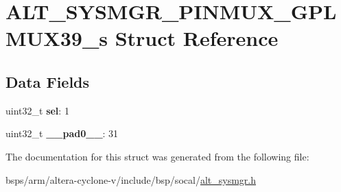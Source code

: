\hypertarget{structALT__SYSMGR__PINMUX__GPLMUX39__s}{}\section{A\+L\+T\+\_\+\+S\+Y\+S\+M\+G\+R\+\_\+\+P\+I\+N\+M\+U\+X\+\_\+\+G\+P\+L\+M\+U\+X39\+\_\+s Struct Reference}
\label{structALT__SYSMGR__PINMUX__GPLMUX39__s}
\subsection*{Data Fields}
\begin{DoxyCompactItemize}
\item 
\mbox{\label{structALT__SYSMGR__PINMUX__GPLMUX39__s_a2f92914c99b141153a70dd6dda2a542b}} 
uint32\+\_\+t {\bfseries sel}\+: 1
\item 
\mbox{\label{structALT__SYSMGR__PINMUX__GPLMUX39__s_a4ac0b5cdeac5ba464118232aea9d19fb}} 
uint32\+\_\+t {\bfseries \+\_\+\+\_\+pad0\+\_\+\+\_\+}\+: 31
\end{DoxyCompactItemize}


The documentation for this struct was generated from the following file\+:\begin{DoxyCompactItemize}
\item 
bsps/arm/altera-\/cyclone-\/v/include/bsp/socal/\mbox{\hyperlink{alt__sysmgr_8h}{alt\+\_\+sysmgr.\+h}}\end{DoxyCompactItemize}
